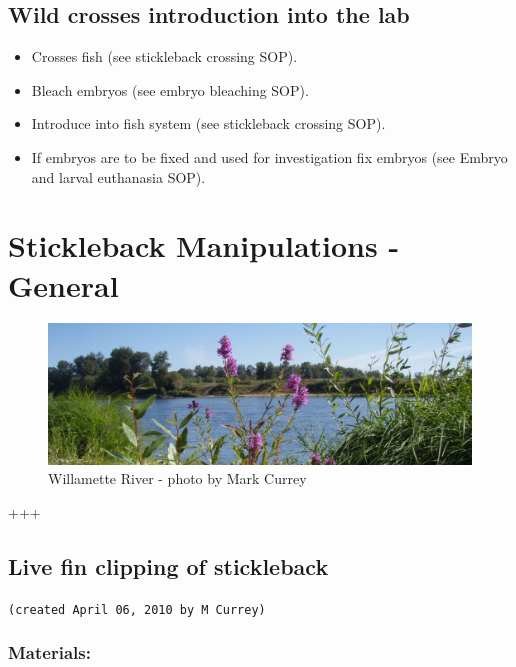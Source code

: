 \documentclass[
]{book}
\providecommand{\tightlist}{%
  \setlength{\itemsep}{0pt}\setlength{\parskip}{0pt}}
\begin{document}
\hypertarget{wild-crosses-introduction-into-the-lab}{%
\section{Wild crosses introduction into the lab}\label{wild-crosses-introduction-into-the-lab}}

\begin{itemize}
\tightlist
\item
  Crosses fish (see stickleback crossing SOP).
\item
  Bleach embryos (see embryo bleaching SOP).
\item
  Introduce into fish system (see stickleback crossing SOP).
\item
  If embryos are to be fixed and used for investigation fix embryos (see Embryo and larval euthanasia SOP).
\end{itemize}

\hypertarget{stickleback-manipulations---general}{%
\chapter{Stickleback Manipulations - General}\label{stickleback-manipulations---general}}

\begin{figure}
\centering
\includegraphics{images/willamette_header.jpg}
\caption{Willamette River - photo by Mark Currey}
\end{figure}

+++

\hypertarget{live-fin-clipping-of-stickleback}{%
\section{Live fin clipping of stickleback}\label{live-fin-clipping-of-stickleback}}

\texttt{(created\ April\ 06,\ 2010\ by\ M\ Currey)}

\hypertarget{materials-5}{%
\subsection{Materials:}\label{materials-5}}
\end{document}

